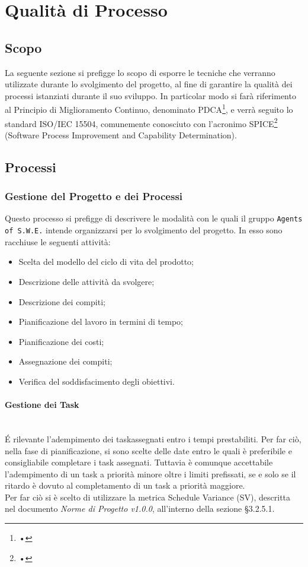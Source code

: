 \section{Qualità di Processo}
\label{qualitaProcesso}

\subsection{Scopo}

La seguente sezione si prefigge lo scopo di esporre le tecniche che verranno utilizzate durante lo svolgimento del progetto, al fine di garantire la qualità dei processi istanziati durante il suo sviluppo. In particolar modo si farà riferimento al Principio di Miglioramento Continuo, denominato PDCA\glossario\footnote{•}, e verrà seguito lo standard ISO/IEC 15504, comunemente conosciuto con l'acronimo SPICE\glossario\footnote{•} (Software Process Improvement and Capability Determination).

\subsection{Processi}
\subsubsection{Gestione del Progetto e dei Processi} 

Questo processo si prefigge di descrivere le modalità con le quali il gruppo \texttt{Agents of S.W.E.} intende organizzarsi per lo svolgimento del progetto. In esso sono racchiuse le seguenti attività:
\begin{itemize}
	\item Scelta del modello del ciclo di vita del prodotto;
	\item Descrizione delle attività da svolgere;
	\item Descrizione dei compiti;
	\item Pianificazione del lavoro in termini di tempo;
	\item Pianificazione dei costi;
	\item Assegnazione dei compiti;
	\item Verifica del soddisfacimento degli obiettivi.
\end{itemize}

\paragraph{Gestione dei Task} \-\\
\'E rilevante	 l'adempimento dei task\glossario assegnati entro i tempi prestabiliti. Per far ciò, nella fase di pianificazione, si sono scelte delle date entro le quali è preferibile e consigliabile completare i task assegnati. Tuttavia è comunque accettabile l'adempimento di un task a priorità minore oltre i limiti prefissati, se e solo se il ritardo è dovuto al completamento di un task a priorità maggiore.\\
Per far ciò si è scelto di utilizzare la metrica Schedule Variance (SV), descritta nel documento \textit{Norme di Progetto v1.0.0}, all'interno della sezione §3.2.5.1.


